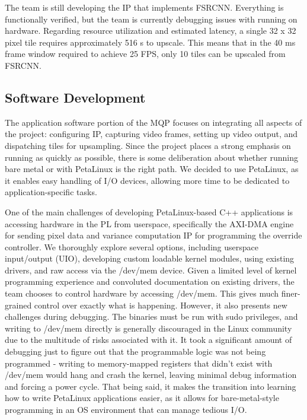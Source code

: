 \documentclass{article}
\newcounter{subsubsubsection}[subsubsection]
\begin{document}
            \noindent The team is still developing the IP that implements FSRCNN. Everything is functionally verified, but the team is currently debugging issues with running on hardware. Regarding resource utilization and estimated latency, a single 32 x 32 pixel tile requires approximately 516 \textmu s to upscale. This means that in the 40 ms frame window required to achieve 25 FPS, only 10 tiles can be upscaled from FSRCNN.
            
    \subsection{Software Development}
    \noindent 	The application software portion of the MQP focuses on integrating all aspects of the project: configuring IP, capturing video frames, setting up video output, and dispatching tiles for upsampling. Since the project places a strong emphasis on running as quickly as possible, there is some deliberation about whether running bare metal or with PetaLinux is the right path. We decided to use PetaLinux, as it enables easy handling of I/O devices, allowing more time to be dedicated to application-specific tasks.

    \par One of the main challenges of developing PetaLinux-based C++ applications is accessing hardware in the PL from userspace, specifically the AXI-DMA engine for sending pixel data and variance computation IP for programming the override controller. We thoroughly explore several options, including userspace input/output (UIO), developing custom loadable kernel modules, using existing drivers, and raw access via the /dev/mem device. Given a limited level of kernel programming experience and convoluted documentation on existing drivers, the team chooses to control hardware by accessing /dev/mem. This gives much finer-grained control over exactly what is happening. However, it also presents new challenges during debugging. The binaries must be run with sudo privileges, and writing to /dev/mem directly is generally discouraged in the Linux community due to the multitude of risks associated with it. It took a significant amount of debugging just to figure out that the programmable logic was not being programmed - writing to memory-mapped registers that didn’t exist with /dev/mem would hang and crash the kernel, leaving minimal debug information and forcing a power cycle. That being said, it makes the transition into learning how to write PetaLinux applications easier, as it allows for bare-metal-style programming in an OS environment that can manage tedious I/O.
\end{document}
